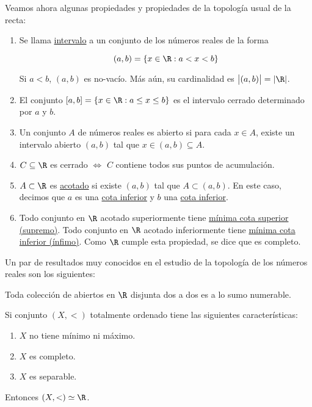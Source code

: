\begin{defn}
    Veamos ahora algunas propiedades y propiedades de la topología usual de la recta:

    \begin{enumerate}
        \item Se llama \ul{intervalo} a un conjunto de los números reales de la forma
            
        \[
        (a, b) = \{x \in \R : a < x < b\}
        \]
            
        Si $a < b$, $(a, b)$ es no-vacío. Más aún, su cardinalidad es $\big|(a,b)\big| = |\R|$.
        \item El conjunto $[a,b] = \{x \in \R : a \leq x \leq b\}$ es el intervalo cerrado determinado por $a$ y $b$.
        \item Un conjunto $A$ de números reales es abierto si para cada $x \in A$, existe un intervalo abierto $(a, b)$ tal que $x \in (a, b) \subseteq A$.
        \item $C \subseteq \R$ es cerrado $\iff$ $C$ contiene todos sus puntos de acumulación.
        \item $A \subset \R$ es \ul{acotado} si existe $(a,b)$ tal que $A \subset (a,b)$. En este caso, decimos que $a$ es una \ul{cota inferior} y $b$ una \ul{cota inferior}.
        \item Todo conjunto en $\R$ acotado superiormente tiene \ul{mínima cota superior (supremo)}. Todo conjunto en $\R$ acotado inferiormente tiene \ul{mínima cota inferior (ínfimo)}. Como $\R$ cumple esta propiedad, se dice que es completo.
    \end{enumerate}
\end{defn}

Un par de resultados muy conocidos en el estudio de la topología de los números reales son los siguientes:

\begin{teo}
    Toda colección de abiertos en $\R$ disjunta dos a dos es a lo sumo numerable.
\end{teo}

\begin{teo}
    Si conjunto $(X, <)$ totalmente ordenado tiene las siguientes características:
    
    \begin{enumerate}
        \item $X$ no tiene mínimo ni máximo.
        \item $X$ es completo.
        \item $X$ es separable.
    \end{enumerate}
    
    Entonces $(X, <) \simeq \R$.
\end{teo}

